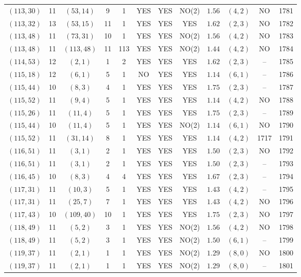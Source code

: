 \begin{longtable}{|c|c|c|c|c|c|c|c|c|c|c|c|}
$(113,30)$ & 11 & $(53,14)$ & 9 & 1 & YES & YES & NO(2) & $1.56$ & $(4,2)$ & NO & 1781\\
$(113,32)$ & 13 & $(53,15)$ & 11 & 1 & YES & YES & YES & $1.62$ & $(2,3)$ & NO & 1782\\
$(113,48)$ & 11 & $(73,31)$ & 10 & 1 & YES & YES & NO(2) & $1.56$ & $(4,2)$ & NO & 1783\\
$(113,48)$ & 11 & $(113,48)$ & 11 & 113 & YES & YES & NO(2) & $1.44$ & $(4,2)$ & NO & 1784\\
$(114,53)$ & 12 & $(2,1)$ & 1 & 2 & YES & YES & YES & $1.62$ & $(2,3)$ & -- & 1785\\
$(115,18)$ & 12 & $(6,1)$ & 5 & 1 & NO & YES & YES & $1.14$ & $(6,1)$ & -- & 1786\\
$(115,44)$ & 10 & $(8,3)$ & 4 & 1 & YES & YES & YES & $1.75$ & $(2,3)$ & -- & 1787\\
$(115,52)$ & 11 & $(9,4)$ & 5 & 1 & YES & YES & YES & $1.14$ & $(4,2)$ & NO & 1788\\
$(115,26)$ & 11 & $(11,4)$ & 5 & 1 & YES & YES & YES & $1.75$ & $(2,3)$ & -- & 1789\\
$(115,44)$ & 10 & $(11,4)$ & 5 & 1 & YES & YES & NO(2) & $1.14$ & $(6,1)$ & NO & 1790\\
$(115,52)$ & 11 & $(31,14)$ & 8 & 1 & YES & YES & YES & $1.14$ & $(4,2)$ & 1717 & 1791\\
$(116,51)$ & 11 & $(3,1)$ & 2 & 1 & YES & YES & YES & $1.50$ & $(2,3)$ & NO & 1792\\
$(116,51)$ & 11 & $(3,1)$ & 2 & 1 & YES & YES & YES & $1.50$ & $(2,3)$ & -- & 1793\\
$(116,45)$ & 10 & $(8,3)$ & 4 & 4 & YES & YES & YES & $1.67$ & $(2,3)$ & -- & 1794\\
$(117,31)$ & 11 & $(10,3)$ & 5 & 1 & YES & YES & YES & $1.43$ & $(4,2)$ & -- & 1795\\
$(117,31)$ & 11 & $(25,7)$ & 7 & 1 & YES & YES & YES & $1.43$ & $(4,2)$ & NO & 1796\\
$(117,43)$ & 10 & $(109,40)$ & 10 & 1 & YES & YES & YES & $1.75$ & $(2,3)$ & NO & 1797\\
$(118,49)$ & 11 & $(5,2)$ & 3 & 1 & YES & YES & NO(2) & $1.56$ & $(4,2)$ & NO & 1798\\
$(118,49)$ & 11 & $(5,2)$ & 3 & 1 & YES & YES & NO(2) & $1.50$ & $(6,1)$ & -- & 1799\\
$(119,37)$ & 11 & $(2,1)$ & 1 & 1 & YES & YES & NO(2) & $1.29$ & $(8,0)$ & NO & 1800\\
$(119,37)$ & 11 & $(2,1)$ & 1 & 1 & YES & YES & NO(2) & $1.29$ & $(8,0)$ & -- & 1801\\

\end{longtable}
